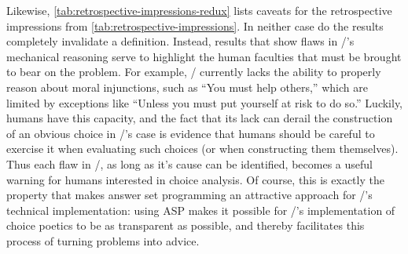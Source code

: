 Likewise, \cref{tab:retrospective-impressions-redux} lists caveats for the retrospective impressions from \cref{tab:retrospective-impressions}.
%
In neither case do the results completely invalidate a definition.
%
Instead, results that show flaws in \dunyazad/'s mechanical reasoning serve to highlight the human faculties that must be brought to bear on the problem.
%
For example, \dunyazad/ currently lacks the ability to properly reason about moral injunctions, such as ``You must help others,'' which are limited by exceptions like ``Unless you must put yourself at risk to do so.''
%
Luckily, humans have this capacity, and the fact that its lack can derail the construction of an obvious choice in \dunyazad/'s case is evidence that humans should be careful to exercise it when evaluating such choices (or when constructing them themselves).
%
Thus each flaw in \dunyazad/, as long as  it's cause can be identified, becomes a useful warning for humans interested in choice analysis.
%
Of course, this is exactly the property that makes answer set programming an attractive approach for \dunyazad/'s technical implementation: using ASP makes it possible for \dunyazad/'s implementation of choice poetics to be as transparent as possible, and thereby facilitates this process of turning problems into advice.



